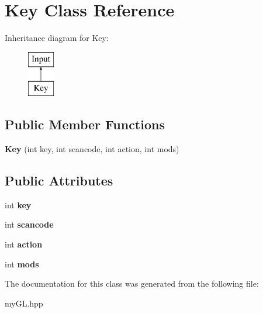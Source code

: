 \hypertarget{classKey}{}\section{Key Class Reference}
\label{classKey}
Inheritance diagram for Key\+:\begin{figure}[H]
\begin{center}
\leavevmode
\includegraphics[height=2.000000cm]{classKey}
\end{center}
\end{figure}
\subsection*{Public Member Functions}
\begin{DoxyCompactItemize}
\item 
{\bfseries Key} (int key, int scancode, int action, int mods)\hypertarget{classKey_a21c1c991388635db9b0690de6ff3292a}{}\label{classKey_a21c1c991388635db9b0690de6ff3292a}

\end{DoxyCompactItemize}
\subsection*{Public Attributes}
\begin{DoxyCompactItemize}
\item 
int {\bfseries key}\hypertarget{classKey_a49ddb6c986197664f6939db5dfd9c244}{}\label{classKey_a49ddb6c986197664f6939db5dfd9c244}

\item 
int {\bfseries scancode}\hypertarget{classKey_a13cb660e3e0d92129eeeaa56c5cc8296}{}\label{classKey_a13cb660e3e0d92129eeeaa56c5cc8296}

\item 
int {\bfseries action}\hypertarget{classKey_add8acc14210865bd9959bf38ee4e82f8}{}\label{classKey_add8acc14210865bd9959bf38ee4e82f8}

\item 
int {\bfseries mods}\hypertarget{classKey_a0e3f757c5b28ee99c9bf6f07811e6637}{}\label{classKey_a0e3f757c5b28ee99c9bf6f07811e6637}

\end{DoxyCompactItemize}


The documentation for this class was generated from the following file\+:\begin{DoxyCompactItemize}
\item 
my\+G\+L.\+hpp\end{DoxyCompactItemize}
